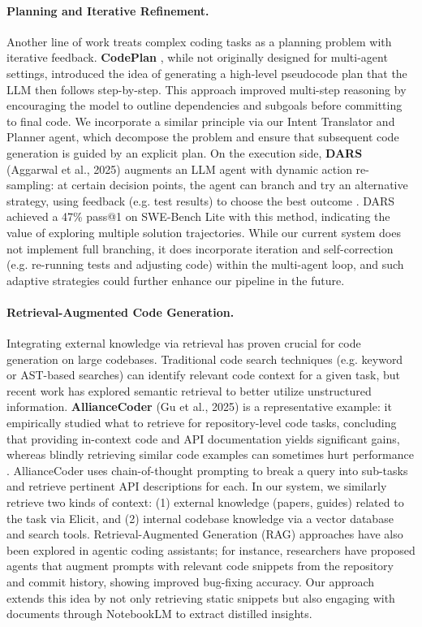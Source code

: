 \documentclass[11pt]{article}
\begin{document}
\paragraph{Planning and Iterative Refinement.}
Another line of work treats complex coding tasks as a planning problem with iterative feedback. \textbf{CodePlan} \cite{codeplan2025}, while not originally designed for multi-agent settings, introduced the idea of generating a high-level pseudocode plan that the LLM then follows step-by-step. This approach improved multi-step reasoning by encouraging the model to outline dependencies and subgoals before committing to final code. We incorporate a similar principle via our Intent Translator and Planner agent, which decompose the problem and ensure that subsequent code generation is guided by an explicit plan. On the execution side, \textbf{DARS} (Aggarwal et al., 2025) augments an LLM agent with dynamic action re-sampling: at certain decision points, the agent can branch and try an alternative strategy, using feedback (e.g. test results) to choose the best outcome \cite{dars2025}. DARS achieved a 47\% pass@1 on SWE-Bench Lite with this method, indicating the value of exploring multiple solution trajectories. While our current system does not implement full branching, it does incorporate iteration and self-correction (e.g. re-running tests and adjusting code) within the multi-agent loop, and such adaptive strategies could further enhance our pipeline in the future.

\paragraph{Retrieval-Augmented Code Generation.}
Integrating external knowledge via retrieval has proven crucial for code generation on large codebases. Traditional code search techniques (e.g. keyword or AST-based searches) can identify relevant code context for a given task, but recent work has explored semantic retrieval to better utilize unstructured information. \textbf{AllianceCoder} (Gu et al., 2025) is a representative example: it empirically studied what to retrieve for repository-level code tasks, concluding that providing in-context code and API documentation yields significant gains, whereas blindly retrieving similar code examples can sometimes hurt performance \cite{alliancecoder2025}. AllianceCoder uses chain-of-thought prompting to break a query into sub-tasks and retrieve pertinent API descriptions for each. In our system, we similarly retrieve two kinds of context: (1) external knowledge (papers, guides) related to the task via Elicit, and (2) internal codebase knowledge via a vector database and search tools. Retrieval-Augmented Generation (RAG) approaches have also been explored in agentic coding assistants; for instance, researchers have proposed agents that augment prompts with relevant code snippets from the repository and commit history, showing improved bug-fixing accuracy. Our approach extends this idea by not only retrieving static snippets but also engaging with documents through NotebookLM to extract distilled insights.
\end{document}
